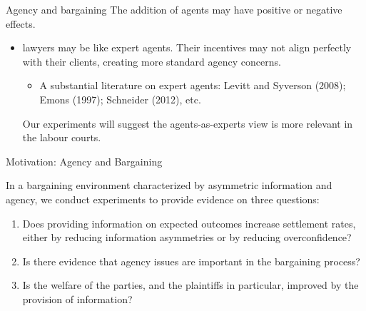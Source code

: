 \documentclass[9pt]{beamer}
\begin{document}
\begin{frame}{Agency and bargaining}
The addition of agents may have positive or negative effects.
\vspace{.2in}
\begin{itemize}
\\
\vspace{.2in}

\item  lawyers may be like expert agents. Their incentives may not align perfectly with their clients, creating more standard agency concerns. \begin{itemize}
    \item A substantial literature on expert agents: Levitt and Syverson (2008); Emons (1997); Schneider (2012), etc.
\end{itemize}
\vspace{.2in}
Our experiments will suggest the agents-as-experts view is more relevant in the labour courts. 
\end{itemize}
 

\end{frame}

\begin{frame}{Motivation: Agency and Bargaining}{}

In a bargaining environment characterized by asymmetric information and agency, we conduct experiments to provide evidence on three questions: 
\begin{enumerate}
      \item Does providing information on expected outcomes increase settlement rates, either by reducing information asymmetries or by reducing overconfidence? 
      \item Is there evidence that agency issues are important in the bargaining process?
      \item Is the welfare of the parties, and the plaintiffs in particular, improved by the provision of information? 
  \end{enumerate}
  
 \end{frame}
 
\end{document}

